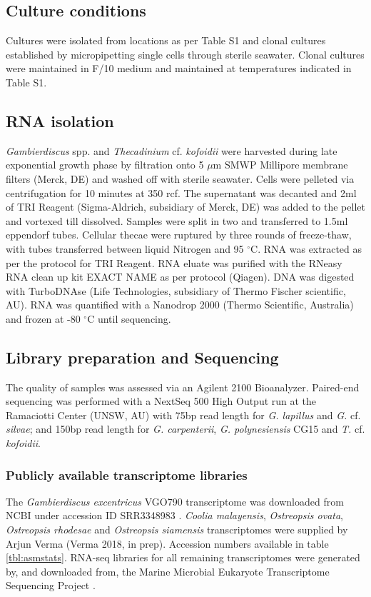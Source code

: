 \documentclass[12pt]{article}
\begin{document}
\subsection*{Culture conditions}
\FloatBarrier
Cultures were isolated from locations as per Table S1 and clonal cultures established by micropipetting single cells through sterile seawater. 
Clonal cultures were maintained in F/10 medium and maintained at temperatures indicated in Table S1. 

\subsection*{RNA isolation}
\emph{Gambierdiscus} spp. and \emph{Thecadinium} cf. \emph{kofoidii} were harvested during late exponential growth phase by filtration onto 5 $\mu$m SMWP Millipore membrane filters (Merck, DE) and washed off with sterile seawater. 
Cells were pelleted via centrifugation for 10 minutes at 350 rcf. 
The supernatant was decanted and 2ml of TRI Reagent (Sigma-Aldrich, subsidiary of Merck, DE) was added to the pellet and vortexed till dissolved. 
Samples were split in two and transferred to 1.5ml eppendorf tubes. 
Cellular thecae were ruptured by three rounds of freeze-thaw, with tubes transferred between liquid Nitrogen and 95 $^{\circ}$C. 
RNA was extracted as per the protocol for TRI Reagent. 
RNA eluate was purified with the RNeasy RNA clean up kit EXACT NAME as per protocol (Qiagen). 
DNA was digested with TurboDNAse (Life Technologies, subsidiary of Thermo Fischer scientific, AU). 
RNA was quantified with a Nanodrop 2000 (Thermo Scientific, Australia) and frozen at -80 $^{\circ}$C until sequencing.
 
\subsection*{Library preparation and Sequencing}
The quality of samples was assessed via an Agilent 2100 Bioanalyzer. 
Paired-end sequencing was performed with a NextSeq 500 High Output run at the Ramaciotti Center (UNSW, AU) with 75bp read length for \emph{G. lapillus} and \emph{G.} cf. \emph{silvae}; and 150bp read length for \emph{G. carpenterii}, \emph{G. polynesiensis} CG15 and \emph{T.} cf. \emph{kofoidii}.

\subsubsection*{Publicly available transcriptome libraries}
The \emph{Gambierdiscus excentricus} VGO790 transcriptome was downloaded from NCBI under accession ID SRR3348983 \cite{kohli2017role}. 
\textit{Coolia malayensis}, \textit{Ostreopsis ovata}, \textit{Ostreopsis rhodesae} and \textit{Ostreopsis siamensis} transcriptomes were supplied by Arjun Verma (Verma 2018, in prep). 
Accession numbers available in table \ref{tbl:asmstats}. 
RNA-seq libraries for all remaining transcriptomes were generated by, and downloaded from, the Marine Microbial Eukaryote Transcriptome Sequencing Project \citep{keeling2014marine}.
\end{document}

